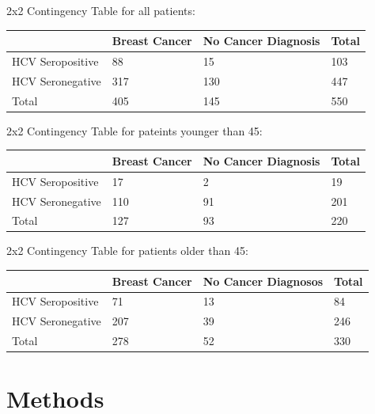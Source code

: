 \documentclass[12pt, titlepage]{article}
\begin{document}
\begin{minipage}{\textwidth}
2x2 Contingency Table for all patients:

\begin{tabular}{ | m{4cm} | m{4cm}| m{4cm} | m{2cm} | }
  \hline
    & Breast Cancer & No Cancer Diagnosis & Total\\ 
  \hline
  HCV Seropositive & 88 & 15 & 103 \\ 
  \hline
  HCV Seronegative & 317 & 130 & 447 \\ 
  \hline
  Total & 405 & 145 & 550 \\ 
  \hline
\end{tabular}

\vspace{1cm}

2x2 Contingency Table for pateints younger than 45:

\begin{tabular}{ | m{4cm} | m{4cm}| m{4cm} | m{2cm} | }
  \hline
    & Breast Cancer & No Cancer Diagnosis & Total\\ 
  \hline
  HCV Seropositive & 17 & 2 & 19 \\ 
  \hline
  HCV Seronegative & 110 & 91 & 201 \\ 
  \hline
  Total & 127 & 93 & 220 \\ 
  \hline
\end{tabular}

\vspace{1cm}

2x2 Contingency Table for patients older than 45:

\begin{tabular}{ | m{4cm} | m{4cm}| m{4cm} | m{2cm} | }
  \hline
    & Breast Cancer & No Cancer Diagnosos & Total\\ 
  \hline
  HCV Seropositive & 71 & 13 & 84 \\ 
  \hline
  HCV Seronegative & 207 & 39 & 246 \\ 
  \hline
  Total & 278 & 52 & 330 \\ 
  \hline
\end{tabular}

\end{minipage}


\section{Methods}
\label{sec:methods}
\end{document}
